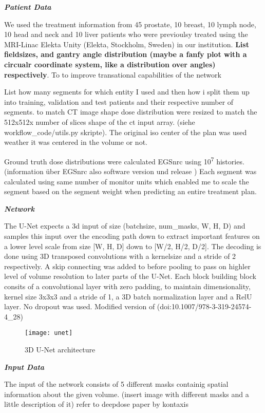 \textbf{\emph{Patient Data}}

We used the treatment information from 45 prostate, 10 breast, 10 lymph node, 10 head and neck and 10 liver patients who were previoulsy treated using the MRI-Linac Elekta Unity (Elekta, Stockholm, Sweden) in our institution. \textbf{List fieldsizes, and gantry angle distribution (maybe a fanfy plot with a circualr coordinate system, like a distribution over angles) respectively}. 
To to improve transational capabilities of the network 

List how many segments for which entity I used and then how i split them up into training, validation and test patients and their respective number of segments. to match CT image shape dose distribution were resized to match the 512x512x number of slices shape of the ct input array. (siehe workflow\_code/utils.py skripte). The original iso center of the plan was used weather it was centered in the volume or not. 

Ground truth dose distributions were calculated EGSnrc using 10\textsuperscript{7} histories. (information über EGSnrc also software version und release \cite{noauthor_nrc-cnrcegsnrc_2021}) Each segment was calculated using same number of monitor units which enabled me to scale the segment based on the segment weight when predicting an entire treatment plan. 

\textbf{\emph{Network}}

The U-Net expects a 3d input of size (batchsize, num\_masks, W, H, D) and samples this input over the encoding path down to extract important features on a lower level scale from size [W, H, D] down to [W/2, H/2, D/2]. The decoding is done using 3D transposed convolutions with a kernelsize and a stride of 2 respectively. A skip connecting was added to before pooling to pass on highler level of volume resolution to later parts of the U-Net. 
Each block building block consits of a convolutional layer with zero padding, to maintain dimensionality, kernel size 3x3x3 and a stride of 1, a 3D batch normalization layer and a RelU layer. No dropout was used. 
Modified version of (doi:10.1007/978-3-319-24574-4\_28)


\begin{figure}
	\centering
    \texttt{[image: unet]}
    \caption{3D U-Net architecture}
    \label{fig: unet}
\end{figure}

\textbf{\emph{Input Data}}

The input of the network consists of 5 different masks containig spatial information about the given volume. (insert image with different masks and a little description of it) refer to deepdose paper by kontaxis \cite{kontaxis_deepdose_2020}

